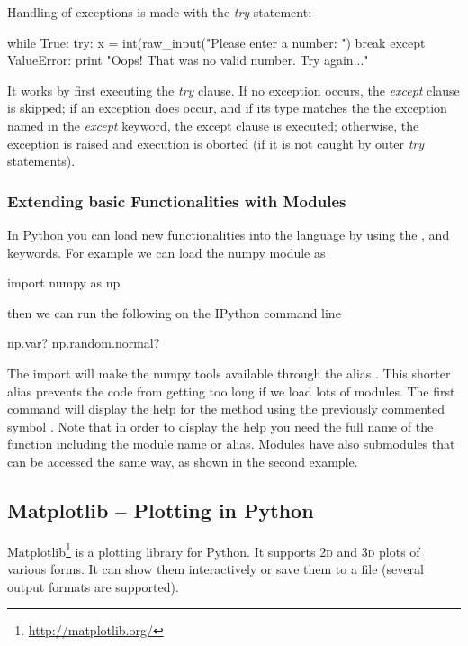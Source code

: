 Handling of exceptions is made with the \textit{try} statement:

\begin{python}
while True:
    try:
        x = int(raw_input("Please enter a number: ")
        break
    except ValueError:
        print "Oops! That was no valid number. Try again..."
\end{python}

It works by first executing the \textit{try} clause. If no exception occurs, the \textit{except} clause is skipped; if an exception does occur, and if its type matches the the exception named in the \textit{except} keyword, the except clause is executed; otherwise, the exception is raised and execution is oborted (if it is not caught by outer \textit{try} statements).


\subsubsection{Extending basic Functionalities with Modules}

In Python you can load new functionalities into the language by using the ,  and  keywords. For example we can load the numpy module as

\begin{python}
import numpy as np
\end{python}

then we can run the following on the IPython command line

\begin{python}
np.var?
np.random.normal?
\end{python}

The import  will make the numpy tools available through the alias . This shorter alias prevents the code from getting too long if we load lots of modules. The first command will display the help for the method  using the previously commented symbol . Note that in order to display the help you need the full name of the function including the module name or alias. Modules have also submodules that can be accessed the same way, as shown in the second example.


\subsection{Matplotlib -- Plotting in Python}

Matplotlib\footnote{\url{http://matplotlib.org/}} is a plotting library for Python. It supports \textsc{2d} and \textsc{3d} plots of various forms. It can show them interactively or save them to a file (several output formats are supported).

